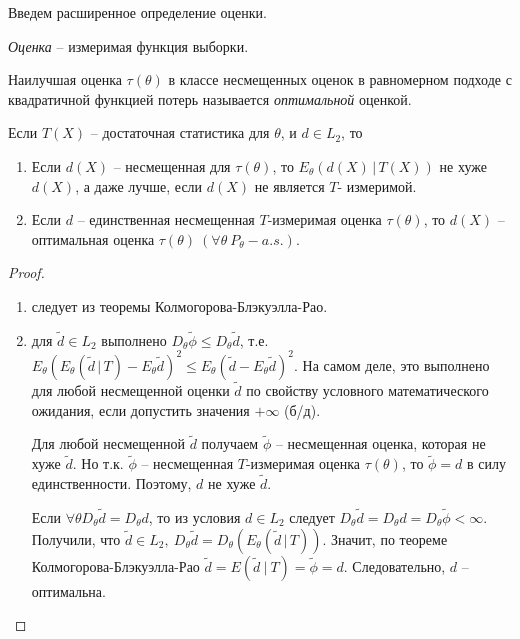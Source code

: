Введем расширенное определение оценки.
\begin{definition}
    \textit{Оценка} -- измеримая функция выборки.
\end{definition}
\begin{definition}
    Наилучшая оценка $\tau(\theta)$ в классе несмещенных оценок в равномерном подходе с квадратичной функцией потерь называется \textit{оптимальной} оценкой.
\end{definition}
\begin{corollary}
    Если $T(X)$ -- достаточная статистика для $\theta$, и $d\in L_2$, то
    \begin{enumerate}
        \item Если $d(X)$ -- несмещенная для $\tau(\theta)$, то $E_\theta(d(X)\, \vert\, T(X))$ не хуже $d(X)$, а даже лучше, если $d(X)$ не является $T$- измеримой.
        \item Если $d$ -- единственная несмещенная $T$-измеримая оценка $\tau(\theta)$, то $d(X)$ -- оптимальная оценка $\tau(\theta)\ (\forall \theta\ P_\theta-a.s.)$.
    \end{enumerate}
\end{corollary}
\begin{proof} ~
    \begin{enumerate}
        \item следует из теоремы Колмогорова-Блэкуэлла-Рао.
        \item для $\widetilde{d} \in L_2$ выполнено $D_\theta\widetilde{\phi} \leq D_\theta\widetilde{d}$, т.е. $E_\theta\left(E_\theta\left(\widetilde{d}\, \vert\, T\right) - E_\theta\widetilde{d}\right)^2 \leq E_\theta\left(\widetilde{d} - E_\theta\widetilde{d}\right)^2$. На самом деле, это выполнено для любой несмещенной оценки $\widetilde{d}$ по свойству условного математического ожидания, если допустить значения $+\infty$ (б/д).
        
        Для любой несмещенной $\widetilde{d}$ получаем $\widetilde{\phi}$ -- несмещенная оценка, которая не хуже $\widetilde{d}$. Но т.к. $\widetilde{\phi}$ -- несмещенная $T$-измеримая оценка $\tau(\theta)$, то $\widetilde{\phi} = d$ в силу единственности. Поэтому, $d$ не хуже $\widetilde{d}$.
        
        Если $\forall \theta D_\theta\widetilde{d} = D_\theta d$, то из условия $d \in L_2$ следует $D_\theta\widetilde{d} = D_\theta d = D_\theta\widetilde{\phi} < \infty$. Получили, что $\tilde{d} \in L_{2},\ D_{\theta }\tilde{d}=D_{\theta }\left( E_{\theta}\left(\tilde{d}\, \vert\, T\right)\right)$. Значит, по теореме Колмогорова-Блэкуэлла-Рао $\displaystyle \tilde{d} =E\left(\tilde{d} \ |\ T\right) =\tilde{\phi } =d$. Следовательно, $\displaystyle d$ -- оптимальна.
    \end{enumerate}
\end{proof}